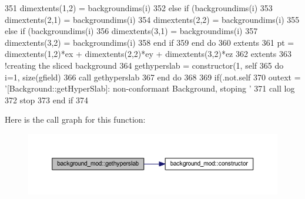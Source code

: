 \begin{DoxyCode}
351             dimextents(1,2) = backgroundims(i)%
352         \textcolor{keywordflow}{else} \textcolor{keywordflow}{if} (backgroundims(i)%
353             dimextents(2,1) = backgroundims(i)%
354             dimextents(2,2) = backgroundims(i)%
355         \textcolor{keywordflow}{else} \textcolor{keywordflow}{if} (backgroundims(i)%
356             dimextents(3,1) = backgroundims(i)%
357             dimextents(3,2) = backgroundims(i)%
358 \textcolor{keywordflow}{        end if}
359 \textcolor{keywordflow}{    end do}
360     extents%
361     pt = dimextents(1,2)*ex + dimextents(2,2)*ey + dimextents(3,2)*ez
362     extents%
363     \textcolor{comment}{!creating the sliced background}
364     gethyperslab = constructor(1, self%
365     \textcolor{keywordflow}{do} i=1, \textcolor{keyword}{size}(gfield)
366         \textcolor{keyword}{call }gethyperslab%
367 \textcolor{keywordflow}{    end do}
368 
369     \textcolor{keywordflow}{if}(.not.self%
370         outext = \textcolor{stringliteral}{'[Background::getHyperSlab]: non-conformant Background, stoping '}
371         \textcolor{keyword}{call }log%
372         stop
373 \textcolor{keywordflow}{    end if}
374 
\end{DoxyCode}
Here is the call graph for this function\+:\nopagebreak
\begin{figure}[H]
\begin{center}
\leavevmode
\includegraphics[width=350pt]{namespacebackground__mod_ae26fda3baab915148ec5749d1eda2ea6_cgraph}
\end{center}
\end{figure}
\mbox{\label{namespacebackground__mod_ac799224ce7ad219bf1fb4f1f42508f45}} 

